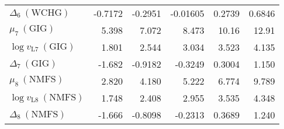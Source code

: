 \documentclass[11pt]{book}
\begin{document}
\begin{table}[ht]
\begin{tabular}{lrrrrr}
  $\Delta_{6}~(\text{WCHG})$ & -0.7172 & -0.2951 & -0.01605 & 0.2739 & 0.6846 \\ 
  $\mu_{7}~(\text{GIG})$ & 5.398 & 7.072 & 8.473 & 10.16 & 12.91 \\ 
  $\log v_{\text{L}7}~(\text{GIG})$ & 1.801 & 2.544 & 3.034 & 3.523 & 4.135 \\ 
  $\Delta_{7}~(\text{GIG})$ & -1.682 & -0.9182 & -0.3249 & 0.3004 & 1.150 \\ 
  $\mu_{8}~(\text{NMFS})$ & 2.820 & 4.180 & 5.222 & 6.774 & 9.789 \\ 
  $\log v_{\text{L}8}~(\text{NMFS})$ & 1.748 & 2.408 & 2.955 & 3.535 & 4.348 \\ 
  $\Delta_{8}~(\text{NMFS})$ & -1.666 & -0.8098 & -0.2313 & 0.3689 & 1.240 \\ 
   \hline
\end{tabular}
\end{table}
\setlength{\tabcolsep}{6pt}
\end{document}
